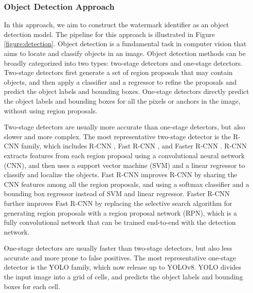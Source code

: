 \subsubsection{Object Detection Approach}
In this approach, we aim to construct the watermark identifier as an object detection model. The pipeline for this approach is illustrated in Figure \ref{figure:detection}. Object detection is a fundamental task in computer vision that aims to locate and classify objects in an image. Object detection methods can be broadly categorized into two types: two-stage detectors and one-stage detectors. Two-stage detectors first generate a set of region proposals that may contain objects, and then apply a classifier and a regressor to refine the proposals and predict the object labels and bounding boxes. One-stage detectors directly predict the object labels and bounding boxes for all the pixels or anchors in the image, without using region proposals.

Two-stage detectors are usually more accurate than one-stage detectors, but also slower and more complex. The most representative two-stage detector is the R-CNN family, which includes R-CNN \cite{girshick2014rich}, Fast R-CNN \cite{girshick2015fast}, and Faster R-CNN  \cite{ren2016faster}. R-CNN extracts features from each region proposal using a convolutional neural network (CNN), and then uses a support vector machine (SVM) and a linear regressor to classify and localize the objects. Fast R-CNN improves R-CNN by sharing the CNN features among all the region proposals, and using a softmax classifier and a bounding box regressor instead of SVM and linear regressor. Faster R-CNN further improves Fast R-CNN by replacing the selective search algorithm for generating region proposals with a region proposal network (RPN), which is a fully convolutional network that can be trained end-to-end with the detection network.

One-stage detectors are usually faster than two-stage detectors, but also less accurate and more prone to false positives. The most representative one-stage detector is the YOLO \cite{redmon2016you} family, which now release up to YOLOv8. YOLO divides the input image into a grid of cells, and predicts the object labels and bounding boxes for each cell.

